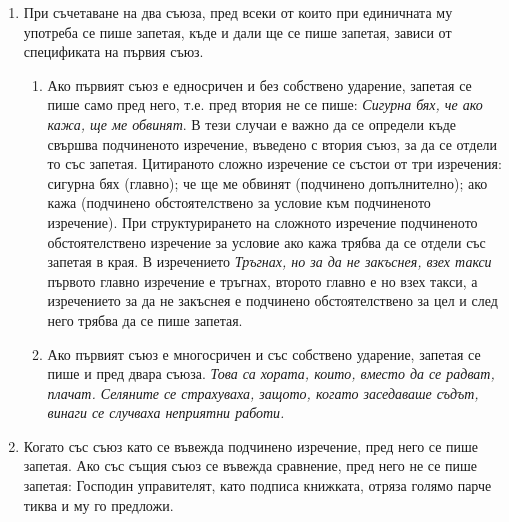 \begin{enumerate}
\item При съчетаване на два съюза, пред всеки от които при единичната му употреба се пише запетая, къде и дали ще се пише запетая, зависи от спецификата на първия съюз.
\begin{enumerate}
    \item Ако първият съюз е едносричен и без собствено ударение, запетая се пише само пред него, т.е. пред втория не се пише: \textit{Сигурна бях, че ако кажа, ще ме обвинят}. В тези случаи е важно да се определи къде свършва подчиненото изречение, въведено с втория съюз, за да се отдели то със запетая. Цитираното сложно изречение се състои от три изречения: сигурна бях (главно); че ще ме обвинят (подчинено допълнително); ако кажа (подчинено обстоятелствено за условие към подчиненото изречение). При структурирането на сложното изречение подчиненото обстоятелствено изречение за условие ако кажа трябва да се отдели със запетая в края. В изречението \textit{Тръгнах, но за да не закъснея, взех такси} първото главно изречение е тръгнах, второто главно е но взех такси, а изречението за да не закъснея е подчинено обстоятелствено за цел и след него трябва да се пише запетая.
    \item Ако първият съюз е многосричен и със собствено ударение, запетая се пише и пред двара съюза. \textit{Това са хората, които, вместо да се радват, плачат. Селяните се страхуваха, защото, когато заседаваше съдът, винаги се случваха неприятни работи.}

\end{enumerate}


\item Когато със съюз като се въвежда подчинено изречение, пред него се пише запетая. Ако със същия съюз се въвежда сравнение, пред него не се пише запетая: Господин управителят, като подписа книжката, отряза голямо парче тиква и му го предложи.
\end{enumerate}